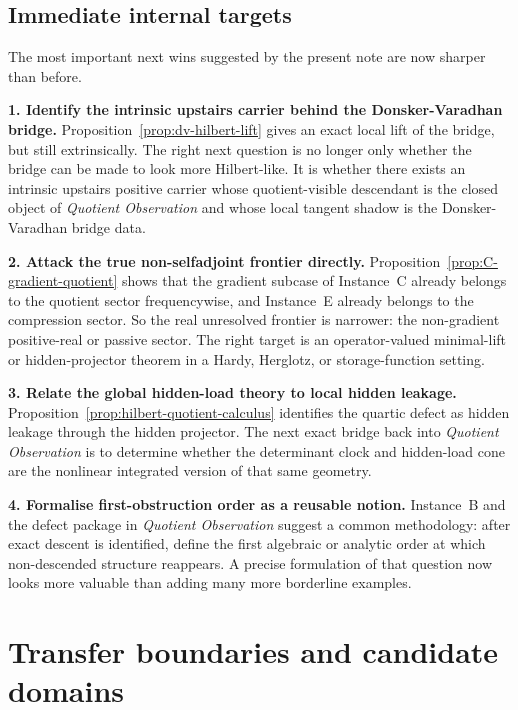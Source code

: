 \documentclass[11pt,a4paper]{article}
\numberwithin{equation}{section}
\theoremstyle{thmcompact}
\theoremstyle{remark}
\begin{document}
\subsection{Immediate internal targets}

The most important next wins suggested by the present note are now sharper than before.

\textbf{1. Identify the intrinsic upstairs carrier behind the Donsker-Varadhan bridge.} Proposition~\ref{prop:dv-hilbert-lift} gives an exact local lift of the bridge, but still extrinsically. The right next question is no longer only whether the bridge can be made to look more Hilbert-like. It is whether there exists an intrinsic upstairs positive carrier whose quotient-visible descendant is the closed object of \emph{Quotient Observation} and whose local tangent shadow is the Donsker-Varadhan bridge data.

\textbf{2. Attack the true non-selfadjoint frontier directly.} Proposition~\ref{prop:C-gradient-quotient} shows that the gradient subcase of Instance~C already belongs to the quotient sector frequencywise, and Instance~E already belongs to the compression sector. So the real unresolved frontier is narrower: the non-gradient positive-real or passive sector. The right target is an operator-valued minimal-lift or hidden-projector theorem in a Hardy, Herglotz, or storage-function setting.

\textbf{3. Relate the global hidden-load theory to local hidden leakage.} Proposition~\ref{prop:hilbert-quotient-calculus} identifies the quartic defect as hidden leakage through the hidden projector. The next exact bridge back into \emph{Quotient Observation} is to determine whether the determinant clock and hidden-load cone are the nonlinear integrated version of that same geometry.

\textbf{4. Formalise first-obstruction order as a reusable notion.} Instance~B and the defect package in \emph{Quotient Observation} suggest a common methodology: after exact descent is identified, define the first algebraic or analytic order at which non-descended structure reappears. A precise formulation of that question now looks more valuable than adding many more borderline examples.

\section{Transfer boundaries and candidate domains}
\label{sec:applications}
\end{document}
